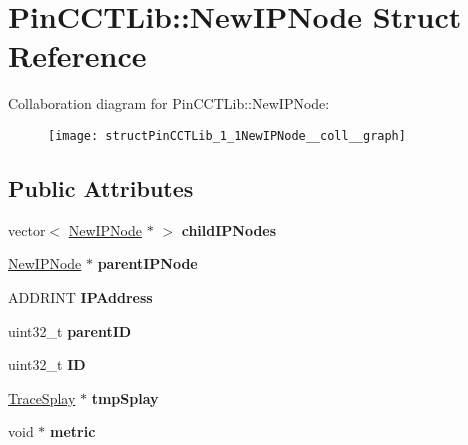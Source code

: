 \hypertarget{structPinCCTLib_1_1NewIPNode}{\section{Pin\-C\-C\-T\-Lib\-:\-:New\-I\-P\-Node Struct Reference}
\label{structPinCCTLib_1_1NewIPNode}
}


Collaboration diagram for Pin\-C\-C\-T\-Lib\-:\-:New\-I\-P\-Node\-:
\nopagebreak
\begin{figure}[H]
\begin{center}
\leavevmode
\texttt{[image: structPinCCTLib\_1\_1NewIPNode\_\_coll\_\_graph]}
\end{center}
\end{figure}
\subsection*{Public Attributes}
\begin{DoxyCompactItemize}
\item 
\hypertarget{structPinCCTLib_1_1NewIPNode_a472aaebd7df6a5d38c59c900571c5fbb}{vector$<$ \hyperlink{structPinCCTLib_1_1NewIPNode}{New\-I\-P\-Node} $\ast$ $>$ {\bfseries child\-I\-P\-Nodes}}\label{structPinCCTLib_1_1NewIPNode_a472aaebd7df6a5d38c59c900571c5fbb}

\item 
\hypertarget{structPinCCTLib_1_1NewIPNode_ace77a40e5649e071d498224c91ddfe61}{\hyperlink{structPinCCTLib_1_1NewIPNode}{New\-I\-P\-Node} $\ast$ {\bfseries parent\-I\-P\-Node}}\label{structPinCCTLib_1_1NewIPNode_ace77a40e5649e071d498224c91ddfe61}

\item 
\hypertarget{structPinCCTLib_1_1NewIPNode_a0d2dc2a76e6c0eb5ba45892610a2d632}{A\-D\-D\-R\-I\-N\-T {\bfseries I\-P\-Address}}\label{structPinCCTLib_1_1NewIPNode_a0d2dc2a76e6c0eb5ba45892610a2d632}

\item 
\hypertarget{structPinCCTLib_1_1NewIPNode_a44ae63d4feb43eda99ff662f8859f790}{uint32\-\_\-t {\bfseries parent\-I\-D}}\label{structPinCCTLib_1_1NewIPNode_a44ae63d4feb43eda99ff662f8859f790}

\item 
\hypertarget{structPinCCTLib_1_1NewIPNode_a015b3c663f80536013782bde977cd408}{uint32\-\_\-t {\bfseries I\-D}}\label{structPinCCTLib_1_1NewIPNode_a015b3c663f80536013782bde977cd408}

\item 
\hypertarget{structPinCCTLib_1_1NewIPNode_a1dab7314258c785f85fe45edb106ad14}{\hyperlink{structPinCCTLib_1_1TraceSplay}{Trace\-Splay} $\ast$ {\bfseries tmp\-Splay}}\label{structPinCCTLib_1_1NewIPNode_a1dab7314258c785f85fe45edb106ad14}

\item 
\hypertarget{structPinCCTLib_1_1NewIPNode_a0e7fa7786b5d4c125a3da1483af36993}{void $\ast$ {\bfseries metric}}\label{structPinCCTLib_1_1NewIPNode_a0e7fa7786b5d4c125a3da1483af36993}

\end{DoxyCompactItemize}



